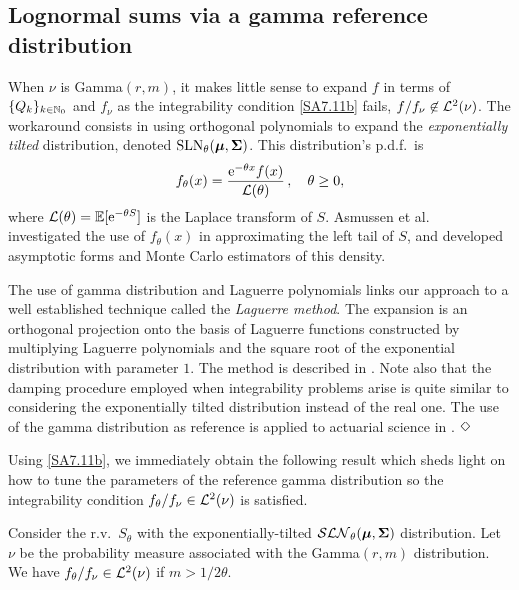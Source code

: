 \subsection{Lognormal sums via a gamma reference distribution} \label{SS:LNGammaNu}

When $\nu$ is Gamma$(r,m)$, it makes little sense to expand $f$ in terms of $\{Q_{k}\}_{k\in\mathbb{N}_0}$ and $f_\nu$ as the integrability condition \eqref{SA7.11b} fails, $f/f_\nu \not\in\mathcal{L}^{2}(\nu)$. The workaround consists in using orthogonal polynomials to expand the \emph{exponentially tilted} distribution, denoted $\mathrm{SLN}_\theta(\bm{\mu}, \bm{\Sigma})$. This distribution's p.d.f.\ is
\begin{equation}\label{ExponentiallyTiltedPDF}
f_\theta(x) = \frac{\mathrm{e}^{-\theta x}f(x)}{\mathcal{L}(\theta)} \,,\quad \theta \ge 0,
\end{equation}
where $\mathcal{L}(\theta)=\operatorname{{\mathbb E}}[\mathrm{e}^{-\theta S}]$ is the Laplace transform of $S$. Asmussen et al.\ \cite{asmussen2015exponential} investigated the use of $f_\theta(x)$ in approximating the left tail of $S$, and developed asymptotic forms and Monte Carlo estimators of this density.
\begin{remark}
The use of gamma distribution and Laguerre polynomials links our approach to a well established technique called the \emph{Laguerre method}. The expansion is an orthogonal projection onto the basis of Laguerre functions constructed by multiplying Laguerre polynomials and the square root of the exponential distribution with parameter $1$. The method is described in \cite{AbChWh95}. Note also that the damping procedure employed when integrability problems arise is quite similar to considering the exponentially tilted distribution instead of the real one. The use of the gamma distribution as reference is applied to actuarial science in \cite{GoLoPo15a,GoLoPo15b}.
$\hfill \Diamond$
\end{remark}
Using \eqref{SA7.11b}, we immediately obtain the following result which
sheds light on how to tune the parameters of the reference gamma distribution so the integrability condition $f_\theta / f_\nu \in\mathcal{L}^2(\nu)$ is satisfied.
\begin{proposition}\label{pr:IntegrabiltyConditionWRTGammaDistribution}
Consider the r.v.\ $S_\theta$ with the exponentially-tilted $\mathcal{SLN}_\theta(\boldsymbol{\mu},\bm{\Sigma})$ distribution. Let $\nu$ be the probability measure associated with the Gamma$(r,m)$ distribution. We have $f_\theta/f_\nu \in\mathcal{L}^2(\nu)$ if
$m>1/2\theta$.
\end{proposition}

